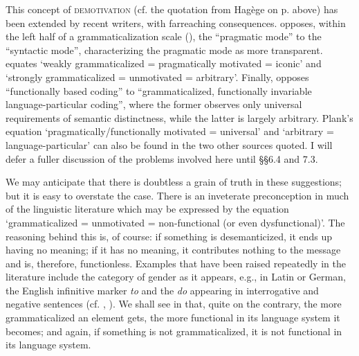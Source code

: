 \label{page140}This concept of \textsc{demotivation} (cf. the quotation from Hagège on p. \pageref{Hagege} above) has been extended by recent writers, with farreaching consequences. \citet[208--233]{Givón1979b} opposes, within the left half of a grammaticalization scale (), the “pragmatic mode” to the “syntactic mode”, characterizing the pragmatic mode as more transparent.\label{page141b} \citet[170--172]{Vincent1980a} equates ‘weakly grammaticalized = pragmatically motivated = iconic’ and ‘strongly grammaticalized = unmotivated = arbitrary’. Finally, \citet[622]{Plank1979b} opposes “functionally based coding” to “grammaticalized, functionally invariable language-particular coding”, where the former observes only universal requirements of semantic distinctness, while the latter is largely arbitrary. Plank's equation ‘pragmatically/functionally motivated = universal’ and ‘arbitrary = language-particular’ can also be found in the two other sources quoted. I will defer a fuller discussion of the problems involved here until §§6.4 and 7.3.\label{page141}

We may anticipate that there is doubtless a grain of truth in these suggestions; but it is easy to overstate the case. There is an inveterate preconception in much of the linguistic literature which may be expressed by the equation ‘grammaticalized = unmotivated = non-functional (or even dysfunctional)’. The reasoning behind this is, of course: if something is desemanticized, it ends up having no meaning; if it has no meaning, it contributes nothing to the message and is, therefore, functionless. Examples that have been raised repeatedly in the literature include the category of gender as it appears, e.g., in Latin or German, the English infinitive marker \textit{to} and the \textit{do} appearing in interrogative and negative sentences (cf. \citealt[97f]{Sapir1921} , \citealt[421]{Lyons1968}). We shall see in  that, quite on the contrary, the more grammaticalized an element gets, the more functional in its language system it becomes; and again, if something is not grammaticalized, it is not functional in its language system.

